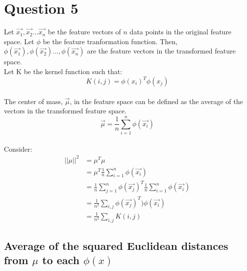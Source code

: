 \documentclass{article}
\begin{document}
\section*{Question 5}
 
Let $\vec{x_{1}}, \vec{x_{2}} ... \vec{x_{n}}$ be the feature vectors of $n$ data points in the original feature space. Let $\phi$ be the feature tranformation function. Then, $\phi(\vec{x_{1}}), \phi(\vec{x_{2}}) ..., \phi(\vec{x_{n}})$ are the feature vectors in the transformed feature space.  
\\
Let K be the kernel function such that:
\begin{equation*}
K(i,j) = \phi(x_{i})^T \phi(x_{j})
\end{equation*} 
\\
The center of mass, $\vec{\mu}$, in the feature space can be defined as the average of the vectors in the transformed feature space. 
\begin{equation*}
\vec{\mu} = \frac{1}{n}\sum_{i=1}^{n} \phi(\vec{x_{i}})
\end{equation*}
\\
Consider:
\begin{equation*}
\begin{split}
||{\mu}||^{2} &= \mu^T\mu \\ 
              &= \mu^T \frac{1}{n}\sum_{i=1}^{n} \phi(\vec{x_{i}}) \\
              &= \frac{1}{n}\sum_{j=1}^{n} \phi(\vec{x_{j}})^T \frac{1}{n}\sum_{i=1}^{n} \phi(\vec{x_{i}}) \\
              &= \frac{1}{n^2} \sum_{i,j} \phi(\vec{x_{j}})^{T}) \phi(\vec{x_{i}}) \\
              &= \frac{1}{n^2} \sum_{i,j} K(i,j)
\end{split}
\end{equation*}

\subsection*{Average of the squared Euclidean distances from $\mu$ to each $\phi(x)$} 
\end{document}
